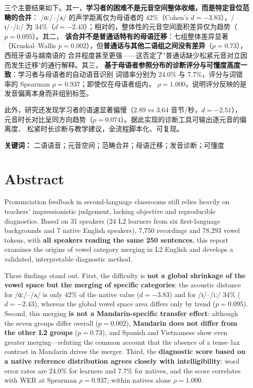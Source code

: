 \documentclass[12pt,a4paper,fontset=fandol]{ctexrep}
\newcommand{\ipa}[1]{/#1/}
\begin{document}
三个主要结果如下。其一，\textbf{学习者的困难不是元音空间整体收缩，而是特定音位范畴的合并}：
\ipa{ɑː}–\ipa{ʌ} 的声学距离仅为母语者的 42\%（Cohen's $d=-3.83$），\ipa{ɪ}–\ipa{iː} 为
34\%（$d=-2.43$）；相对的，整体性的元音空间面积差异仅为趋势（$p=0.095$）。其二，
\textbf{该合并不是普通话特有的母语迁移}：七组整体差异显著（Kruskal--Wallis
$p=0.002$），但\textbf{普通话与其他二语组之间没有差异}（$p=0.73$），西班牙语与越南语的
合并程度甚至更强——这否定了"普通话缺少松紧元音对立因而发生迁移"的通行解释。其三，
\textbf{基于母语者参照分布的诊断评分与可懂度高度一致}：学习者与母语者的自动语音识别
词错率分别为 24.0\% 与 7.7\%，评分与词错率的 Spearman $\rho=0.937$；即使仅在母语者组内，
$\rho=1.000$，说明评分反映的是发音偏离本身而非组别标签。

此外，研究还发现学习者的语速显著偏慢（2.89 vs 3.64 音节/秒，$d=-2.51$），
元音时长对比呈同方向趋势（$p=0.074$）。据此实现的诊断工具可输出逐元音的偏离度、
松紧时长诊断与教学建议，全流程脚本化、可复现。

\vspace{0.5em}
\noindent\textbf{关键词：} 二语语音；元音空间；范畴合并；母语迁移；发音诊断；可懂度

\chapter*{Abstract}

Pronunciation feedback in second-language classrooms still relies heavily on teachers'
impressionistic judgement, lacking objective and reproducible diagnostics. Based on
31 speakers (24 L2 learners from six first-language backgrounds and 7 native English
speakers), 7{,}750 recordings and 78{,}293 vowel tokens, with \textbf{all speakers reading the
same 250 sentences}, this report examines the origins of vowel category merging in L2 English
and develops a validated, interpretable diagnostic method.

Three findings stand out. First, the difficulty is \textbf{not a global shrinkage of the vowel
space but the merging of specific categories}: the acoustic distance for \ipa{ɑː}--\ipa{ʌ} is only
42\% of the native value ($d=-3.83$) and for \ipa{ɪ}--\ipa{iː} 34\% ($d=-2.43$), whereas the
global vowel space area differs only by trend ($p=0.095$). Second, this merging
\textbf{is not a Mandarin-specific transfer effect}: although the seven groups differ overall
($p=0.002$), \textbf{Mandarin does not differ from the other L2 groups} ($p=0.73$), and Spanish
and Vietnamese show even greater merging---refuting the common account that the absence of a
tense--lax contrast in Mandarin drives the merger. Third, the \textbf{diagnostic score based on a
native reference distribution agrees closely with intelligibility}: word error rates are 24.0\%
for learners and 7.7\% for natives, and the score correlates with WER at Spearman $\rho=0.937$;
within natives alone $\rho=1.000$.
\end{document}
